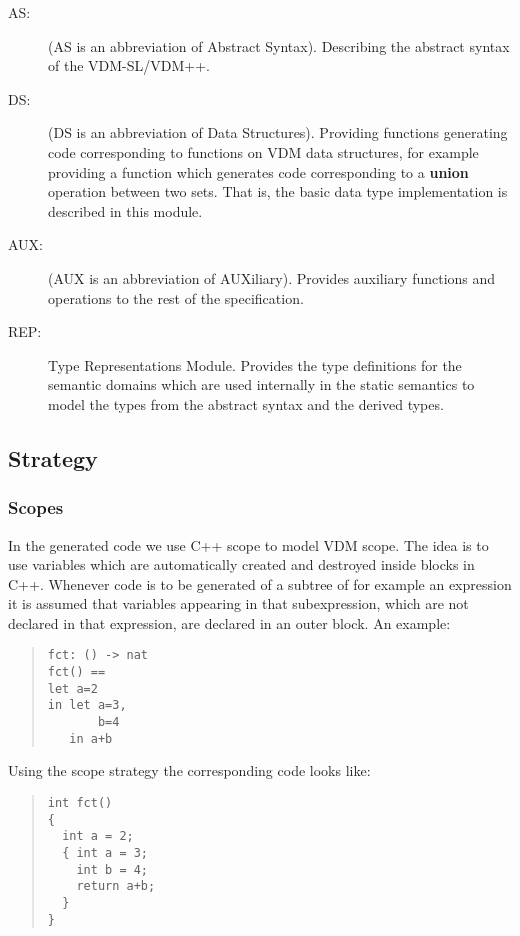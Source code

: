 \documentclass[a4paper,dvips]{article}
\begin{document}
\begin{description}
\item[AS: ] (AS is an abbreviation of Abstract Syntax). Describing the
  abstract syntax of the VDM-SL/VDM++.

\item[DS: ] (DS is an abbreviation of Data Structures). Providing
  functions generating code corresponding to functions on VDM data
  structures, for example providing a function which generates code
  corresponding to a {\bf union} operation between two sets. That is,
  the basic data type implementation is described in this module.

\item[AUX:] (AUX is an abbreviation of AUXiliary). Provides auxiliary
  functions and operations to the rest of the specification.

\item[REP: ] Type Representations Module. Provides the type
  definitions for the semantic domains which are used internally in
  the static semantics to model the types from the abstract syntax and
  the derived types.


\end{description}


\subsection{Strategy}

\subsubsection{Scopes}

In the generated code we use C++ scope to model VDM scope.  The idea
is to use variables which are automatically created and destroyed
inside blocks in C++. Whenever code is to be generated of a subtree of
for example an expression it is assumed that variables appearing in
that subexpression, which are not declared in that expression, are
declared in an outer block. An example:

\begin{quote}
\begin{verbatim}
fct: () -> nat
fct() ==
let a=2
in let a=3,
       b=4
   in a+b
\end{verbatim}
\end{quote}

Using the scope strategy the corresponding code looks like:

\begin{quote}
\begin{verbatim}
int fct()
{
  int a = 2;
  { int a = 3;
    int b = 4;
    return a+b;
  }
}
\end{verbatim}
\end{quote}
\end{document}
